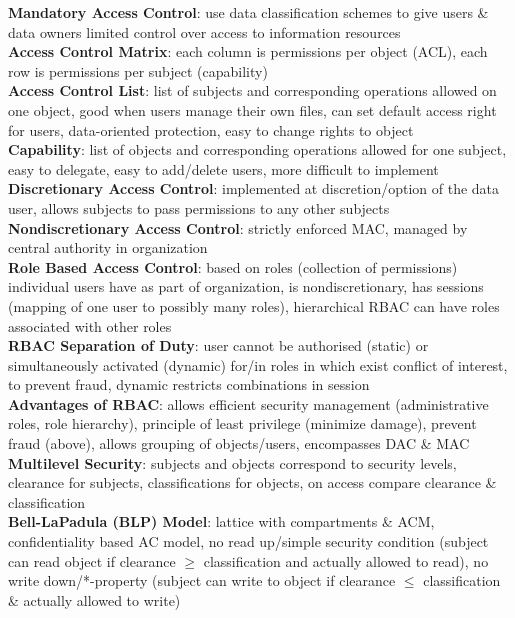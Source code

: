 \documentclass[a4paper]{article}
\begin{document}
\begin{multicols}{2}
        \textbf{Mandatory Access Control}: use data classification schemes to give users \& data owners limited control over access to information resources\\
        \textbf{Access Control Matrix}: each column is permissions per object (ACL), each row is permissions per subject (capability)\\
        \textbf{Access Control List}: list of subjects and corresponding operations allowed on one object, good when users manage their own files, can set default access right for users, data-oriented protection, easy to change rights to object\\
        \textbf{Capability}: list of objects and corresponding operations allowed for one subject, easy to delegate, easy to add/delete users, more difficult to implement\\
        \textbf{Discretionary Access Control}: implemented at discretion/option of the data user, allows subjects to pass permissions to any other subjects\\
        \textbf{Nondiscretionary Access Control}: strictly enforced MAC, managed by  central authority in organization\\
        \textbf{Role Based Access Control}: based on roles (collection of permissions) individual users have as part of organization, is nondiscretionary, has sessions (mapping of one user to possibly many roles), hierarchical RBAC can have roles associated with other roles\\
        \textbf{RBAC Separation of Duty}: user cannot be authorised (static) or simultaneously activated (dynamic) for/in roles in which exist conflict of interest, to prevent fraud, dynamic restricts combinations in session\\
        \textbf{Advantages of RBAC}: allows efficient security management (administrative roles, role hierarchy), principle of least privilege (minimize damage), prevent fraud (above), allows grouping of objects/users, encompasses DAC \& MAC\\
        \textbf{Multilevel Security}: subjects and objects correspond to security levels, clearance for subjects, classifications for objects, on access compare clearance \& classification\\
        \textbf{Bell-LaPadula (BLP) Model}: lattice with compartments \& ACM, confidentiality based AC model, no read up/simple security condition (subject can read object if clearance $\geq$ classification and actually allowed to read), no write down/*-property (subject can write to object if clearance $\leq$ classification \& actually allowed to write)\\

\end{multicols}
\end{document}

